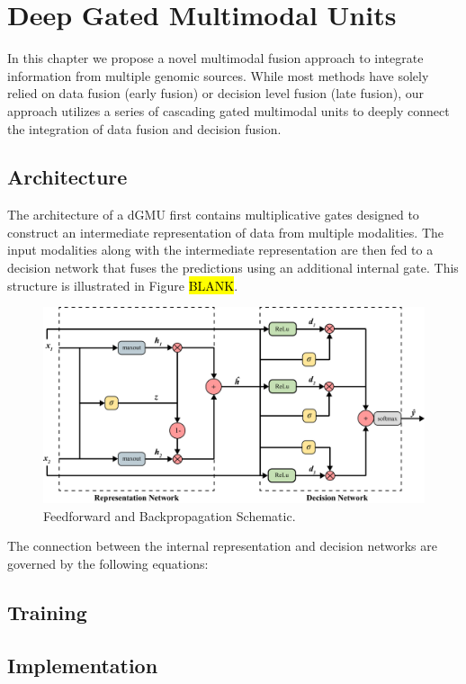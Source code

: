 \chapter{Deep Gated Multimodal Units} \label{chap:deepgmu}

In this chapter we propose a novel multimodal fusion approach to integrate information from multiple genomic sources. While most methods have solely relied on data fusion (early fusion) or decision level fusion (late fusion), our approach utilizes a series of cascading gated multimodal units to deeply connect the integration of data fusion and decision fusion.

\section{Architecture}

The architecture of a dGMU first contains multiplicative gates designed to construct an intermediate representation of data from multiple modalities. The input modalities along with the intermediate representation are then fed to a decision network that fuses the predictions using an additional internal gate. This structure is illustrated in Figure \hl{BLANK}. 

\begin{figure}[h!]
    \centering
    \includegraphics[width=\textwidth]{img/dGMU.png}
    \caption{Feedforward and Backpropagation Schematic.}
    \label{fig:backprop}
\end{figure}

The connection between the internal representation and decision networks are governed by the following equations:

\section{Training}
\section{Implementation}